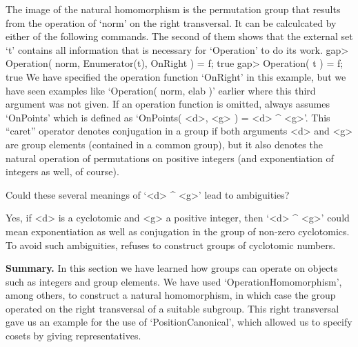 The  image  of the natural  homomorphism   is the permutation  group that
results from the operation of `norm' on the right  transversal. It can be
calculcated by either of the following commands. The second of them shows
that the external set `t' contains all information  that is necessary for
`Operation' to do its work.
\beginexample
    gap> Operation( norm, Enumerator(t), OnRight ) = f;
    true
    gap> Operation( t ) = f;
    true
\endexample
We  have specified the operation function  `OnRight' in this example, but
we have seen  examples like `Operation( norm,  elab )' earlier where this
third argument was not given. If an operation function is omitted, {\GAP}
always assumes `OnPoints' which is defined as `OnPoints( <d>, <g> ) = <d>
^ <g>'. This ``caret''  operator denotes conjugation in  a group if  both
arguments <d> and  <g> are group elements  (contained in a common group),
but it also  denotes the natural  operation  of permutations on  positive
integers (and exponentiation of integers as well, of course).

\exercise Could   these  several meanings    of  `<d>  ^ <g>'   lead   to
ambiguities?

\answer Yes, if <d> is a cyclotomic and <g> a positive integer, then `<d>
^ <g>' could mean exponentiation  as well as conjugation  in the group of
non-zero cyclotomics.  To   avoid such  ambiguities, {\GAP}   refuses  to
construct groups of cyclotomic numbers.

%  

{\bf Summary.} In this section we have learned  how groups can operate on
{\GAP}   objects such as  integers  and   group  elements.  We  have used
`OperationHomomorphism',    among   others,   to   construct   a  natural
homomorphism,  in which case the  group operated on the right transversal
of a suitable subgroup. This right transversal gave us an example for the
use of `PositionCanonical', which allowed  us to specify cosets by giving
representatives.

